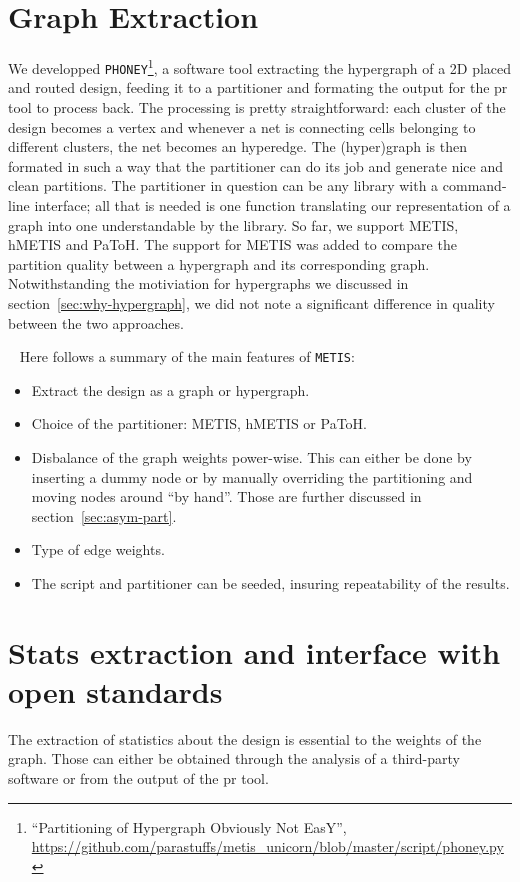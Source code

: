 \documentclass[11pt,a4paper]{report} %
\theoremstyle{customdef}
\begin{document}
\section{Graph Extraction}\label{sec:graph-extr}
We developped \texttt{PHONEY}\footnote{“Partitioning of Hypergraph Obviously Not EasY”, \url{https://github.com/parastuffs/metis_unicorn/blob/master/script/phoney.py}}, a software tool extracting the hypergraph of a 2D placed and routed design, feeding it to a partitioner and formating the output for the \gls{pr} tool to process back.
The processing is pretty straightforward: each cluster of the design becomes a vertex and whenever a net is connecting cells belonging to different clusters, the net becomes an hyperedge.
The (hyper)graph is then formated in such a way that the partitioner can do its job and generate nice and clean partitions.
The partitioner in question can be any library with a command-line interface; all that is needed is one function translating our representation of a graph into one understandable by the library.
So far, we support METIS, hMETIS and PaToH.
The support for METIS was added to compare the partition quality between a hypergraph and its corresponding graph.
Notwithstanding the motiviation for hypergraphs we discussed in section~\ref{sec:why-hypergraph}, we did not note a significant difference in quality between the two approaches.


~\newline{}
Here follows a summary of the main features of \texttt{METIS}:
\begin{itemize}
	\item Extract the design as a graph or hypergraph.
	\item Choice of the partitioner: METIS, hMETIS or PaToH.
	\item Disbalance of the graph weights power-wise. This can either be done by inserting a dummy node or by manually overriding the partitioning and moving nodes around “by hand”. Those are further discussed in section~\ref{sec:asym-part}.
	\item Type of edge weights.
	\item The script and partitioner can be seeded, insuring repeatability of the results.
\end{itemize}



\section{Stats extraction and interface with open standards}
The extraction of statistics about the design is essential to the weights of the graph.
Those can either be obtained through the analysis of a third-party software or from the output of the \gls{pr} tool.
\end{document}

